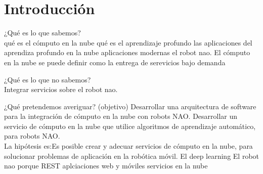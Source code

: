 

\chapter*{Introducción}
\label{\detokenize{introduction:cloudnao-una-arquitectura-de-software-para-la-integracion-de-computo-en-la-nube-con-robots-nao}}\label{\detokenize{introduction:introduccion}}\label{\detokenize{introduction::doc}}
%


¿Qué es lo que sabemos?
\\
qué es el cómputo en la nube
qué es el aprendizaje profundo
las aplicaciones del aprendiza profundo en la nube
aplicaciones modernas
el robot nao.
El cómputo en la nube se puede definir como
la entrega de serevicios bajo demanda

¿Qué es lo que no sabemos?\\
Integrar servicios sobre el robot nao.


¿Qué pretendemos averiguar? (objetivo)
Desarrollar una arquitectura de software para la
integración de cómputo en la nube con robots NAO.
Desarrollar un servicio de cómputo en la nube que utilice
algoritmos de aprendizaje automático, para robots NAO.
\\

La hipótesis es:Es posible crear y adecuar servicios de cómputo en la nube,
para solucionar problemas de aplicación en la robótica móvil.
El deep learning 
El robot nao
porque REST
aplciaciones web y móviles
servicios en la nube
%
%
